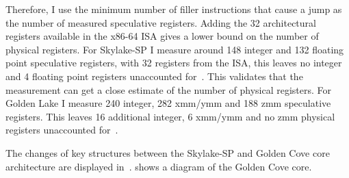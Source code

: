 Therefore, I use the minimum number of filler instructions that cause a jump as the number of measured speculative registers.
Adding the 32 architectural registers available in the x86-64 \ac{ISA} gives a lower bound on the number of physical registers.
For Skylake-SP I measure around 148 integer and 132 floating point speculative registers, with 32 registers from the \ac{ISA}, this leaves no integer and 4 floating point registers unaccounted for~\cite{Intel_2017_Skylake_SP}.
This validates that the measurement can get a close estimate of the number of physical registers.
For Golden Lake I measure 240 integer, 282 xmm/ymm and 188 zmm speculative registers.
This leaves 16 additional integer, 6 xmm/ymm and no zmm physical registers unaccounted for~\cite{ServerTheHome_2023_SPR_Press,Wccftech_2023_SPR_Press}.

The changes of key structures between the Skylake-SP and Golden Cove core architecture are displayed in~.
 shows a diagram of the Golden Cove core.


